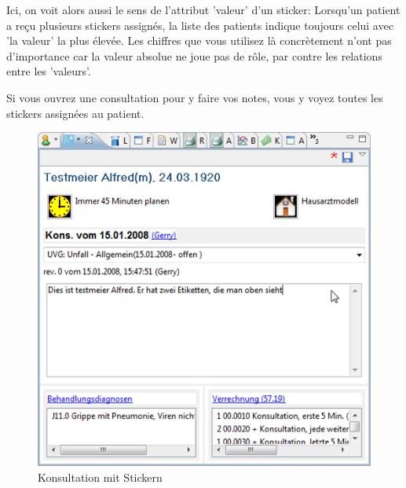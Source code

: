Ici, on voit alors aussi le sens de l'attribut 'valeur' d'un sticker:
Lorsqu'un patient a reçu plusieurs stickers assignés, la liste des patients indique toujours
celui avec  'la valeur' la plus élevée. Les chiffres que vous utilisez là concrètement n'ont pas d'importance car la valeur absolue ne joue pas de rôle, par contre les relations entre les 'valeurs'.


\medskip

Si vous ouvrez une consultation pour y faire vos notes, vous y voyez toutes les stickers assignées au patient.
\begin{figure}
    \includegraphics{images/etikette2}
    \caption{Konsultation mit Stickern}
    \label{fig:etiketten3}
\end{figure}


\clearpage

